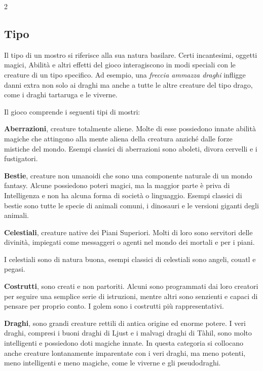 \begin{multicols}{2}

\subsection{Tipo}

Il tipo di un mostro si riferisce alla sua natura basilare. Certi incantesimi, oggetti magici, Abilità e altri effetti del gioco interagiscono in modi speciali con le creature di un tipo specifico. Ad esempio, una \emph{freccia ammazza draghi} infligge danni extra non solo ai draghi ma anche a tutte le altre creature del tipo drago, come i draghi tartaruga e le viverne.

Il gioco comprende i seguenti tipi di mostri:

\smallskip\textbf{Aberrazioni}, creature totalmente aliene. Molte di esse possiedono innate abilità magiche che attingono alla mente aliena della creatura anziché dalle forze mistiche del mondo. Esempi classici di aberrazioni sono aboleti, divora cervelli e i fustigatori.

\smallskip\textbf{Bestie}, creature non umanoidi che sono una componente naturale di un mondo fantasy. Alcune possiedono poteri magici, ma la maggior parte è priva di Intelligenza e non ha alcuna forma di società o linguaggio. Esempi classici di bestie sono tutte le specie di animali comuni, i dinosauri e le versioni giganti degli animali.

\smallskip\textbf{Celestiali}, creature native dei Piani Superiori. Molti di loro sono servitori delle divinità, impiegati come messaggeri o agenti nel mondo dei mortali e per i piani.

\medskip

I celestiali sono di natura buona, esempi classici di celestiali sono angeli, couatl e pegasi.

\smallskip\textbf{Costrutti}, sono creati e non partoriti. Alcuni sono programmati dai loro creatori per seguire una semplice serie di istruzioni, mentre altri sono senzienti e capaci di pensare per proprio conto. I golem sono i costrutti più rappresentativi.

\smallskip\textbf{Draghi}, sono grandi creature rettili di antica origine ed enorme potere. I veri draghi, compresi i buoni draghi di Ljust e i malvagi draghi di Tàhil, sono molto intelligenti e possiedono doti magiche innate. In questa categoria si collocano anche creature lontanamente imparentate con i veri draghi, ma meno potenti, meno intelligenti e meno magiche, come le viverne e gli pseudodraghi.


\end{multicols}
